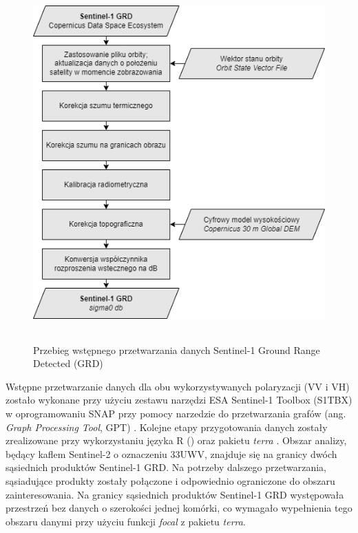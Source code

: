 \documentclass{amuthesis}
\begin{document}
\begin{figure}[t]

{\centering \includegraphics[width=5.01042in,height=5.38542in]{figures/sentinel1_workflow.drawio.png}

}

\caption{\label{fig-rycina-s1-workflow}Przebieg wstępnego przetwarzania
danych Sentinel-1 Ground Range Detected (GRD)}

\end{figure}

Wstępne przetwarzanie danych dla obu wykorzystywanych polaryzacji (VV i
VH) zostało wykonane przy użyciu zestawu narzędzi ESA Sentinel-1 Toolbox
(S1TBX) \autocite{s1tbx} w oprogramowaniu SNAP \autocite{snap} przy
pomocy narzedzie do przetwarzania grafów (ang. \emph{Graph Processing
Tool}, GPT) . Kolejne etapy przygotowania danych zostały zrealizowane
przy wykorzystaniu języka R (\textcite{R-base}) oraz pakietu
\emph{terra} \autocite{R-terra}. Obszar analizy, będący kaflem
Sentinel-2 o oznaczeniu 33UWV, znajduje się na granicy dwóch sąsiednich
produktów Sentinel-1 GRD. Na potrzeby dalszego przetwarzania,
sąsiadujące produkty zostały połączone i odpowiednio ograniczone do
obszaru zainteresowania. Na granicy sąsiednich produktów Sentinel-1 GRD
występowała przestrzeń bez danych o szerokości jednej komórki, co
wymagało wypełnienia tego obszaru danymi przy użyciu funkcji
\emph{focal} z pakietu \emph{terra}.
\end{document}
